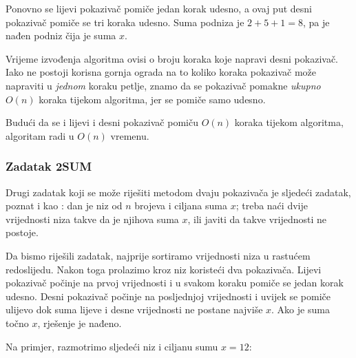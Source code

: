 Ponovno se lijevi pokazivač pomiče jedan korak udesno,
a ovaj put desni pokazivač pomiče se tri
koraka udesno.
Suma podniza je $2+5+1=8$, pa je nađen podniz
čija je suma $x$.

\begin{center}
\end{center}

Vrijeme izvođenja algoritma ovisi o
broju koraka koje napravi desni pokazivač.
Iako ne postoji korisna gornja ograda na to koliko koraka
pokazivač može napraviti u \emph{jednom} koraku petlje,
znamo da se pokazivač pomakne \emph{ukupno}
$O(n)$ koraka tijekom algoritma,
jer se pomiče samo udesno.

Budući da se i lijevi i desni pokazivač
pomiču $O(n)$ koraka tijekom algoritma,
algoritam radi u $O(n)$ vremenu.

\subsubsection{Zadatak 2SUM}


Drugi zadatak koji se može riješiti
metodom dvaju pokazivača je sljedeći zadatak,
poznat i kao :
dan je niz od $n$ brojeva i
ciljana suma $x$; treba naći
dvije vrijednosti niza takve da je njihova suma $x$,
ili javiti da takve vrijednosti ne postoje.

Da bismo riješili zadatak, najprije
sortiramo vrijednosti niza u rastućem redoslijedu.
Nakon toga prolazimo kroz niz koristeći
dva pokazivača.
Lijevi pokazivač počinje na prvoj vrijednosti
i u svakom koraku pomiče se jedan korak udesno.
Desni pokazivač počinje na posljednjoj vrijednosti
i uvijek se pomiče ulijevo dok suma
lijeve i desne vrijednosti ne postane najviše $x$.
Ako je suma točno $x$,
rješenje je nađeno.

Na primjer, razmotrimo sljedeći niz
i ciljanu sumu $x=12$:
\begin{center}
\end{center}

